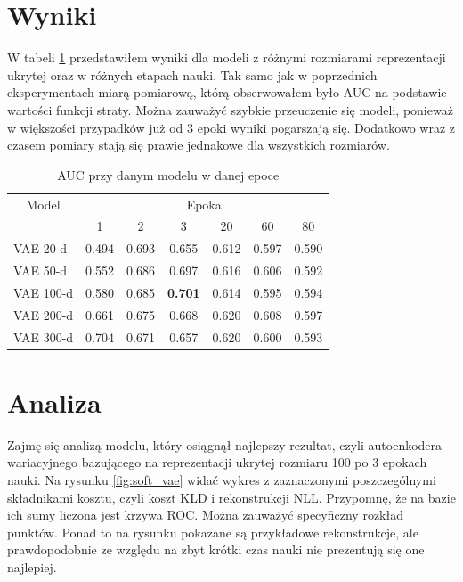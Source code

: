 \section{Wyniki}

W tabeli \ref{table:results} przedstawiłem wyniki dla modeli z różnymi rozmiarami reprezentacji ukrytej oraz w różnych etapach nauki. Tak samo jak w poprzednich eksperymentach miarą pomiarową, którą obserwowałem było AUC na podstawie wartości funkcji straty. Można zauważyć szybkie przeuczenie się modeli, ponieważ w większości przypadków już od 3 epoki wyniki pogarszają się. Dodatkowo wraz z czasem pomiary stają się prawie jednakowe dla wszystkich rozmiarów. 

\begin{table}[h!]
	\centering
    \begin{tabular}{ l | c c c c c c }
 
    \multicolumn{1}{c}{Model} & \multicolumn{6}{c}{Epoka} \\
    \cmidrule(r){1-1} \cmidrule(r){2-7}
     		& 1 & 2 & 3 & 20 & 60 & 80 \\ \cmidrule(r){2-7}
    VAE 20-d 	& 0.494 & 0.693 & 0.655 & 0.612 & 0.597 & 0.590 \\ \hline
    VAE 50-d 	& 0.552 & 0.686 & 0.697 & 0.616 & 0.606 & 0.592 \\ \hline
    VAE 100-d 	& 0.580 & 0.685 & \textbf{0.701} & 0.614 & 0.595 & 0.594 \\ \hline
    VAE 200-d   & 0.661 & 0.675 & 0.668 & 0.620 & 0.608 & 0.597 \\ \hline
    VAE 300-d   & 0.704 & 0.671 & 0.657 & 0.620 & 0.600 & 0.593 \\
    \toprule
    \end{tabular}
    \caption{AUC przy danym modelu w danej epoce}
	\label{table:results}
\end{table}

\section{Analiza}

Zajmę się analizą modelu, który osiągnął najlepszy rezultat, czyli autoenkodera wariacyjnego bazującego na reprezentacji ukrytej rozmiaru 100 po 3 epokach nauki. Na rysunku \ref{fig:soft_vae} widać wykres z zaznaczonymi poszczególnymi składnikami kosztu, czyli koszt KLD i rekonstrukcji NLL. Przypomnę, że na bazie ich sumy liczona jest krzywa ROC. Można zauważyć specyficzny rozkład punktów. Ponad to na rysunku pokazane są przykładowe rekonstrukcje, ale prawdopodobnie ze względu na zbyt krótki czas nauki nie prezentują się one najlepiej.

